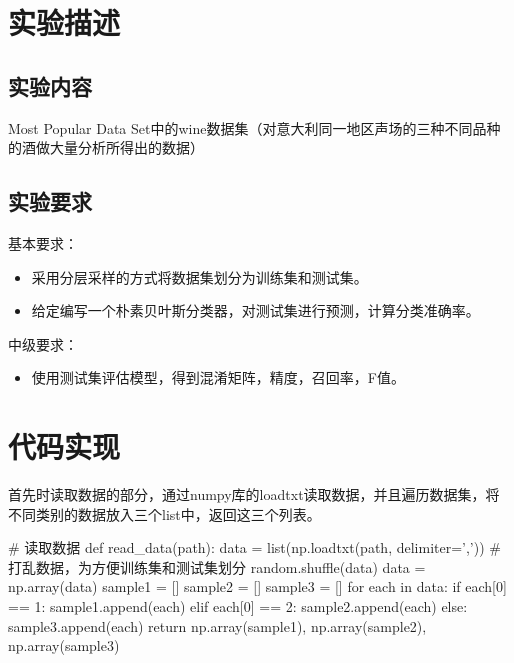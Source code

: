 \documentclass[UTF8,a4paper,10pt]{ctexart}
\begin{document}
\section{实验描述}
\subsection{实验内容}
Most Popular Data Set中的wine数据集（对意大利同一地区声场的三种不同品种的酒做大量分析所得出的数据）

\subsection{实验要求}


基本要求：

\begin{itemize}
   \item 采用分层采样的方式将数据集划分为训练集和测试集。 
   \item 给定编写一个朴素贝叶斯分类器，对测试集进行预测，计算分类准确率。
\end{itemize}

中级要求：

\begin{itemize}
   \item 使用测试集评估模型，得到混淆矩阵，精度，召回率，F值。
\end{itemize}



\section{代码实现}

首先时读取数据的部分，通过numpy库的loadtxt读取数据，并且遍历数据集，将不同类别的数据放入三个list中，返回这三个列表。

\begin{python}
   # 读取数据
   def read_data(path):
       data = list(np.loadtxt(path, delimiter=','))
       # 打乱数据，为方便训练集和测试集划分
       random.shuffle(data)
       data = np.array(data)
       sample1 = []
       sample2 = []
       sample3 = []
       for each in data:
           if each[0] == 1:
               sample1.append(each)
           elif each[0] == 2:
               sample2.append(each)
           else:
               sample3.append(each)
       return np.array(sample1), np.array(sample2), np.array(sample3)

\end{python}
\end{document}
